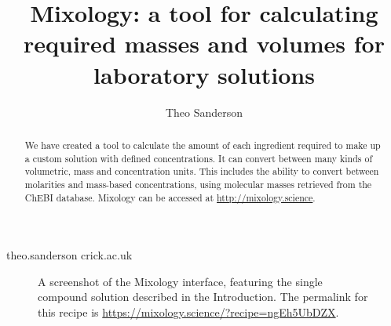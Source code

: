 \documentclass[times, twoside]{zHenriquesLab-StyleBioRxiv}
\begin{document}
\noindent%

\title{Mixology: a tool for calculating required masses and volumes for laboratory solutions}

\author[1,\Letter]{Theo Sanderson}


\maketitle



\begin{abstract}
We have created a tool to calculate the amount of each ingredient required to make up a custom solution with defined concentrations. It can convert between many kinds of volumetric, mass and concentration units. This includes the ability to convert between molarities and mass-based concentrations, using molecular masses retrieved from the ChEBI database. Mixology can be accessed at \url{http://mixology.science}.
\end {abstract}



\begin{corrauthor}
theo.sanderson \at crick.ac.uk
\end{corrauthor}

\begin{figure}[b!]
\centering
{}
\caption{A screenshot of the Mixology interface, featuring the single compound solution described in the Introduction. The permalink for this recipe is \url{https://mixology.science/?recipe=ngEh5UbDZX}.}
\end{figure}
\end{document}
